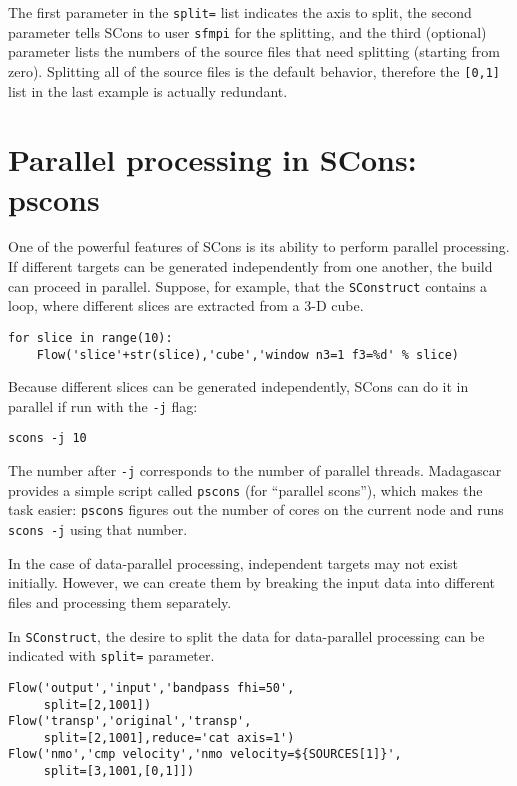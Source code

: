 The first parameter in the \texttt{split=} list indicates the axis to
split, the second parameter tells SCons to user \texttt{sfmpi} for the
splitting, and the third (optional) parameter lists the numbers of the
source files that need splitting (starting from zero). Splitting all
of the source files is the default behavior, therefore the
\texttt{[0,1]} list in the last example is actually redundant.



\section{Parallel processing in SCons: pscons}

One of the powerful features of SCons is its ability to perform
parallel processing. If different targets can be generated
independently from one another, the build can proceed in
parallel. Suppose, for example, that the \texttt{SConstruct} contains
a loop, where different slices are extracted from a 3-D cube.
\begin{lstlisting}
for slice in range(10):
    Flow('slice'+str(slice),'cube','window n3=1 f3=%d' % slice)
\end{lstlisting}  
Because different slices can be generated independently, SCons can do it in parallel if run with the \texttt{-j} flag:
\begin{verbatim}
scons -j 10
\end{verbatim}
The number after \texttt{-j} corresponds to the number of parallel
threads. Madagascar provides a simple script called \texttt{pscons} (for
``parallel scons''), which makes the task easier: \texttt{pscons}
figures out the number of cores on the current node and runs
\texttt{scons -j} using that number.

In the case of data-parallel processing, independent targets may not
exist initially. However, we can create them by breaking the input
data into different files and processing them separately.

In \texttt{SConstruct}, the desire to split the data for data-parallel
processing can be indicated with \texttt{split=} parameter.

\lstset{language=python,showstringspaces=false,frame=single}
\begin{lstlisting}
Flow('output','input','bandpass fhi=50',
     split=[2,1001])
Flow('transp','original','transp',
     split=[2,1001],reduce='cat axis=1')
Flow('nmo','cmp velocity','nmo velocity=${SOURCES[1]}',
     split=[3,1001,[0,1]])
\end{lstlisting}

